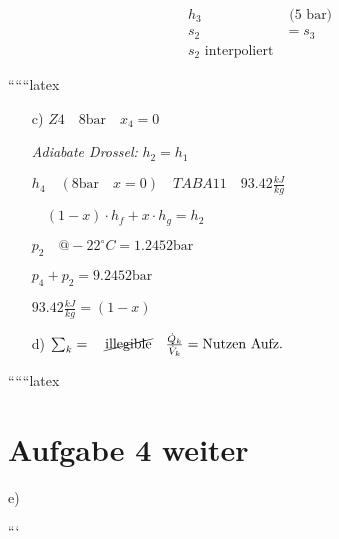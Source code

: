\begin{align*}
h_3 &\text{ (5 bar)} \\
s_2 &= s_3 \\
s_2 \text{ interpoliert}
\end{align*}

``````latex


\begin{itemize}
    \item[c)] \(Z4 \quad 8 \text{bar} \quad x_4 = 0\)
    
    \textit{Adiabate Drossel:} \(h_2 = h_1\)
    
    \(h_4 \quad (8 \text{bar} \quad x = 0) \quad TAB A11 \quad 93.42 \frac{kJ}{kg}\)
    
    \(\quad (1-x) \cdot h_f + x \cdot h_g = h_2\)
    
    \(p_2 \quad @-22^\circ C = 1.2452 \text{bar}\)
    
    \(p_4 + p_2 = 9.2452 \text{bar}\)
    
    \(93.42 \frac{kJ}{kg} = (1-x)\)
    
    \item[d)] \(\sum_k = \quad \cancel{\text{illegible}} \quad \frac{\dot{Q}_k}{\dot{V}_k} = \text{Nutzen Aufz.}\)
\end{itemize}

``````latex


\section*{Aufgabe 4 weiter}

e)

```